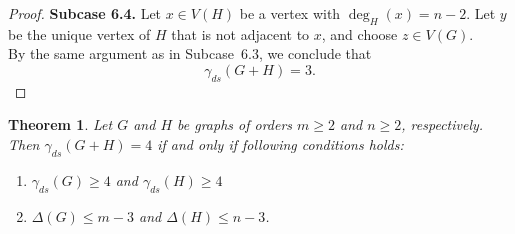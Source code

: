 \documentclass{article}
\newtheorem{theorem}{Theorem}[section]
\begin{document}
\begin{proof}
\textbf{Subcase 6.4.} Let $x\in V(H)$ be a vertex with $\deg_H(x)=n-2.$
Let $y$ be the unique vertex of $H$ that is not adjacent to $x$, and choose $z\in V(G)$.\\
By the same argument as in Subcase~6.3, we conclude that
\[
\gamma_{ds}(G+H)=3.
\]
\end{proof}

\begin{theorem}
Let $G$ and $H$ be graphs of orders $m\ge2$ and $n\ge2$, respectively. Then $\gamma_{ds}(G+H)=4$
if and  only if  following conditions holds:
\begin{enumerate}
    \item $\gamma_{ds}(G)\ge4$ and $\gamma_{ds}(H)\ge4$
    \item $\Delta(G)\le m-3$ and $\Delta(H)\le n-3$.
\end{enumerate}
\end{theorem}
\end{document}
